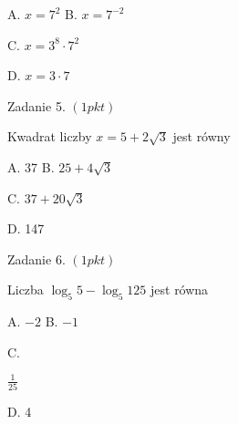 \documentclass[a4paper,12pt]{article}
\begin{document}
A. $x=7^{2}$ B. $x=7^{-2}$

C. $x=3^{8}\cdot 7^{2}$

D. $x=3\cdot 7$

Zadanie 5. $(1pkt)$

Kwadrat liczby $x=5+2\sqrt{3}$ jest równy

A. 37 B. $25+4\sqrt{3}$

C. $37+20\sqrt{3}$

D. 147

Zadanie 6. $(1pkt)$

Liczba $\log_{5}5-\log_{5}125$ jest równa

A. $-2$ B. $-1$

C.

$\displaystyle \frac{1}{25}$

D. 4
\end{document}
